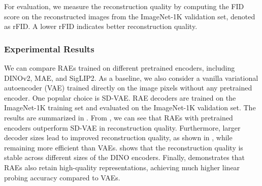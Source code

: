 \documentclass[../../book-main.tex]{subfiles}
\begin{document}
For evaluation, we measure the reconstruction quality by computing
the FID score \citep{heusel2017gans} on the reconstructed images from
the ImageNet-1K validation set, denoted as rFID.
A lower rFID
indicates better reconstruction quality.

\subsubsection{Experimental Results}
We can compare RAEs trained on different pretrained encoders,
including DINOv2, MAE, and SigLIP2.
As a baseline, we also consider a
vanilla variational autoencoder (VAE) trained directly on the image
pixels without any pretrained encoder.
One popular choice is SD-VAE.
RAE decoders are trained on the ImageNet-1K training set and
evaluated on the ImageNet-1K validation set.
The results are
summarized in . From
, we can see that RAEs with
pretrained encoders outperform SD-VAE in reconstruction quality.
Furthermore, larger decoder sizes lead to improved reconstruction
quality, as shown in , while
remaining more efficient than VAEs.
shows that the reconstruction quality is stable across different
sizes of the DINO encoders.
Finally, 
demonstrates that RAEs also retain high-quality representations,
achieving much higher linear probing accuracy compared to VAEs.
\end{document}

